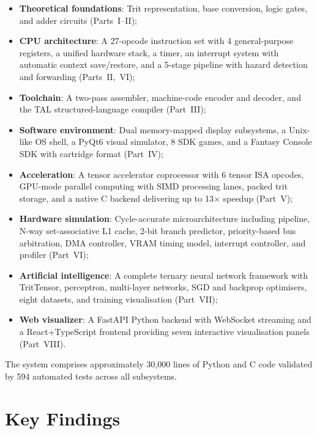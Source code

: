 \documentclass[12pt,a4paper,twoside]{book}
\theoremstyle{trinarytheorem}
\theoremstyle{trinarydefinition}
\begin{document}
\begin{itemize}
    \item \textbf{Theoretical foundations}: Trit representation, base
          conversion, logic gates, and adder circuits (Parts~I--II);
    \item \textbf{CPU architecture}: A 27-opcode instruction set with 4
          general-purpose registers, a unified hardware stack, a timer, an interrupt
          system with automatic context save/restore, and a 5-stage pipeline with hazard detection and
          forwarding (Parts~II,~VI);
    \item \textbf{Toolchain}: A two-pass assembler, machine-code encoder
          and decoder, and the TAL structured-language compiler (Part~III);
    \item \textbf{Software environment}: Dual memory-mapped display
          subsystems, a Unix-like OS shell, a PyQt6 visual simulator,
          8 SDK games, and a Fantasy Console SDK with cartridge format
          (Part~IV);
    \item \textbf{Acceleration}: A tensor accelerator coprocessor with
          6 tensor ISA opcodes, GPU-mode parallel computing with SIMD
          processing lanes, packed trit storage, and a native C backend
          delivering up to 13$\times$ speedup (Part~V);
    \item \textbf{Hardware simulation}: Cycle-accurate microarchitecture
          including pipeline, N-way set-associative L1 cache, 2-bit branch
          predictor, priority-based bus arbitration, DMA controller,
          VRAM timing model, interrupt controller, and profiler
          (Part~VI);
    \item \textbf{Artificial intelligence}: A complete ternary neural
          network framework with TritTensor, perceptron, multi-layer
          networks, SGD and backprop optimisers, eight datasets,
          and training visualisation (Part~VII);
    \item \textbf{Web visualizer}: A FastAPI Python backend with WebSocket
          streaming and a React+TypeScript frontend providing seven
          interactive visualisation panels (Part~VIII).
\end{itemize}

The system comprises approximately 30,000 lines of Python and C code
validated by 594 automated tests across all subsystems.

\section{Key Findings}
\end{document}
